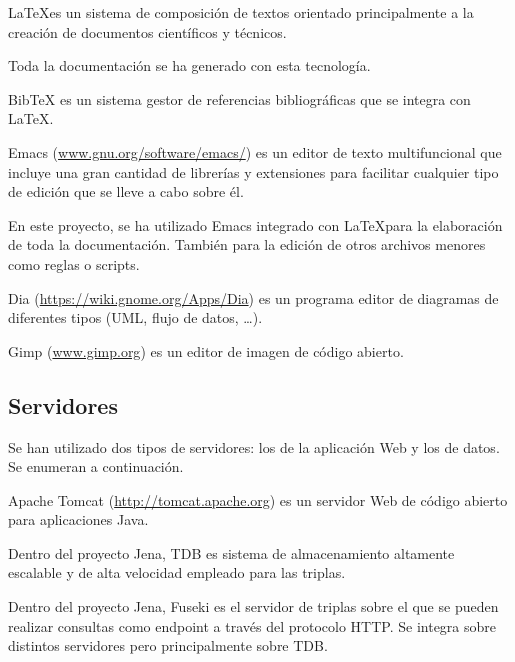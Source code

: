 \begin{definitionlist} 
\item[\LaTeX]

\LaTeX es un sistema de composición de textos orientado principalmente a la
creación de documentos científicos y técnicos. 

Toda la documentación se ha generado con esta tecnología. 

\item[BibTeX]
BibTeX es un sistema gestor de referencias bibliográficas que se integra con
\LaTeX.

\item[Emacs]

Emacs (\url{www.gnu.org/software/emacs/}) es un editor de texto multifuncional
que incluye una gran cantidad de librerías y extensiones para facilitar
cualquier tipo de edición que se lleve a cabo sobre él. 

En este proyecto, se ha utilizado Emacs integrado con \LaTeX para la
elaboración de toda la documentación. También para la edición de otros archivos
menores como reglas o scripts. 

\item[Dia]

Dia (\url{https://wiki.gnome.org/Apps/Dia}) es un programa editor de diagramas
de diferentes tipos (\acs{UML}, flujo de datos, \ldots). 

\item[Gimp]

Gimp (\url{www.gimp.org}) es un editor de imagen de código abierto. 

\end{definitionlist}

\subsection{Servidores}

Se han utilizado dos tipos de servidores: los de la aplicación Web y los de
datos. Se enumeran a continuación. 

\begin{definitionlist} 
\item[Apache Tomcat]

Apache Tomcat (\url{http://tomcat.apache.org}) es un servidor Web de código
abierto para aplicaciones Java. 

\item[Jena TDB]

Dentro del proyecto Jena, TDB es sistema de almacenamiento altamente escalable y
de alta velocidad empleado para las triplas. 


\item[Jena Fuseki]

Dentro del proyecto Jena, Fuseki es el servidor de triplas sobre el que se
pueden realizar consultas como endpoint a través del protocolo \acs{HTTP}. Se
integra sobre distintos servidores pero principalmente sobre TDB. 

\end{definitionlist}

